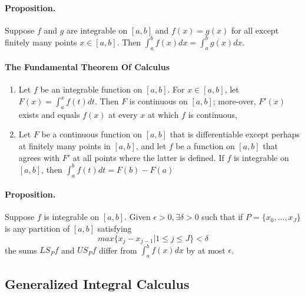\documentclass[11pt]{article}
\begin{document}
\paragraph{Proposition.} Suppose $f$ and $g$ are integrable on $[a,b]$ and $f(x) = g(x)$ for all except finitely many points $x\in [a,b]$. Then $\int_a^bf(x)dx = \int_a^bg(x)dx$. 

\paragraph{The Fundamental Theorem Of Calculus}
\begin{enumerate}
    \item Let $f$ be an integrable function on $[a,b]$. For $x\in [a,b]$, let $F(x) = \int_a^xf(t)dt$. Then $F$ is continuous on $[a,b]$; more-over, $F'(x)$ exists and equals $f(x)$ at every $x$ at which $f$ is continuous,
    \item Let $F$ be a continuous function on $[a,b]$ that is differentiable except perhaps at finitely many points in $[a,b]$, and let $f$ be a function on $[a,b]$ that agrees with $F'$ at all points where the latter is defined. If $f$ is integrable on $[a,b]$, then $\int_a^bf(t)dt=F(b)-F(a)$
\end{enumerate}

\paragraph{Proposition.} Suppose $f$ is integrable on $[a,b]$. Given $\epsilon>0, \exists \delta > 0$ such that if $P= \{x_0,...,x_J\}$ is any partition of $[a,b]$ satisfying
\begin{equation*}
    max\{x_j-x_{j-1} | 1\leq j \leq J\} < \delta
\end{equation*}
the sums $LS_Pf$ and $US_Pf$ differ from $\int_a^bf(x)dx$ by at most $\epsilon$.

\subsection{Generalized Integral Calculus}
\end{document}
